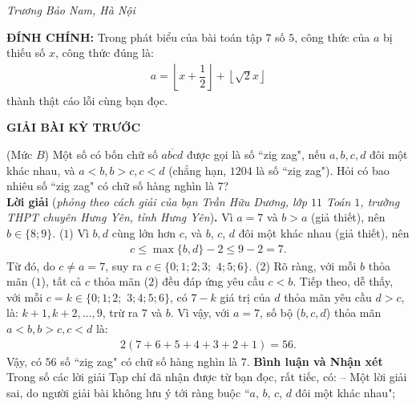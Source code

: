\begin{multicols}{2}
	\begin{flushright}
		\textit{Trương Bảo Nam, Hà Nội}
	\end{flushright}
	\textbf{\color{thachthuctoanhoc}ĐÍNH CHÍNH:}
	Trong phát biểu của bài toán {} tập $7$ số $5$, công thức của $a$ bị thiếu số $x$, công thức đúng là:
	\begin{align*}
		a=\left\lfloor x+\dfrac12\right\rfloor+\left\lfloor\sqrt{2}x\right\rfloor
	\end{align*} thành thật cáo lỗi cùng bạn đọc.
\end{multicols}
\centerline{{\large{\textbf{\color{thachthuctoanhoc}GIẢI BÀI KỲ TRƯỚC}}}}
\vspace*{-5pt}
\begin{multicols}{2}
	\setlength{\abovedisplayskip}{4pt}
	\setlength{\belowdisplayskip}{4pt}
	{}
	(Mức $B$) Một số có bốn chữ số $\overline{a b c d}$ được gọi là số ``zig zag", nếu $a, b, c, d$ đôi một khác nhau, và $a<b, b>c, c<d$ (chẳng hạn, $1204$ là số ``zig zag"). Hỏi có bao nhiêu số ``zig zag" có chữ số hàng nghìn là $7$?\\
	\textbf{\color{thachthuctoanhoc}Lời giải} (\textit{phỏng theo cách giải của bạn Trần Hữu Dương, lớp $11$ Toán $1$, trường THPT chuyên Hưng Yên, tỉnh Hưng Yên})\textbf{\color{thachthuctoanhoc}.}
	Vì $a = 7$ và $b > a$ (giả thiết), nên $b \in \{8; 9\}$. \hfill ($1$)
	\vskip 0.05cm
	Vì $b, d$ cùng lớn hơn $c$, và $b$, $c$, $d$ đôi một khác nhau (giả thiết), nên
	\begin{align*}
		c \le \max\{b, d\} - 2 \le 9 - 2 = 7.
	\end{align*}
	Từ đó, do $c \ne a = 7$, suy ra $c \in \{0; 1; 2; 3;$ $4; 5; 6\}$. \hfill($2$)
	\vskip 0.05cm
	Rõ ràng, với mỗi $b$ thỏa mãn ($1$), tất cả $c$ thỏa mãn ($2$) đều đáp ứng yêu cầu $c < b$.
	\vskip 0.05cm
	Tiếp theo, dễ thấy, với mỗi $c = k \in \{0; 1; 2;$ $3; 4; 5; 6\}$, có $7 - k$ giá trị của $d$ thỏa mãn yêu cầu $d > c$, là: $k \!+\! 1, k \!+\! 2, \ldots, 9$, trừ ra $7$ và $b$.
	\vskip 0.05cm
	Vì vậy, với $a = 7$, số bộ ($b, c, d$) thỏa mãn $a < b, b > c, c < d$ là:
	\begin{align*}
		2(7 + 6 + 5 + 4 + 3 + 2 + 1) = 56.
	\end{align*}
	Vậy, có $56$ số ``zig zag" có chữ số hàng nghìn là $7$.
	\vskip 0.05cm
	\textbf{\color{thachthuctoanhoc}Bình luận và Nhận xét}
	\vskip 0.05cm	
	Trong số các lời giải Tạp chí đã nhận được từ bạn đọc, rất tiếc, có:
	\vskip 0.05cm
	-- Một lời giải sai, do người giải bài không lưu ý tới ràng buộc ``$a$, $b$, $c$, $d$ đôi một khác nhau";

\end{multicols}
